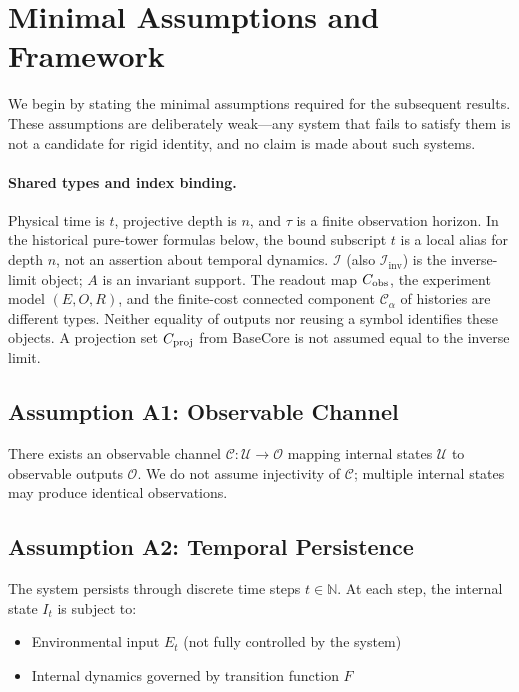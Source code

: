 \documentclass[11pt,a4paper]{article}
\theoremstyle{plain}
\theoremstyle{definition}
\theoremstyle{remark}
\begin{document}
\section{Minimal Assumptions and Framework}

We begin by stating the minimal assumptions required for the subsequent results. These assumptions are deliberately weak---any system that fails to satisfy them is not a candidate for rigid identity, and no claim is made about such systems.

\paragraph{Shared types and index binding.}
Physical time is $t$, projective depth is $n$, and $\tau$ is a finite observation horizon. In the historical pure-tower formulas below, the bound subscript $t$ is a local alias for depth $n$, not an assertion about temporal dynamics. $\mathcal I$ (also $\mathcal I_{\mathrm{inv}}$) is the inverse-limit object; $A$ is an invariant support. The readout map $C_{\rm obs}$, the experiment model $(E,O,R)$, and the finite-cost connected component $\mathcal C_\alpha$ of histories are different types. Neither equality of outputs nor reusing a symbol identifies these objects. A projection set $C_{\rm proj}$ from BaseCore is not assumed equal to the inverse limit.

\subsection{Assumption A1: Observable Channel}

There exists an observable channel $\mathcal{C}: \mathcal{U} \to \mathcal{O}$ mapping internal states $\mathcal{U}$ to observable outputs $\mathcal{O}$. We do not assume injectivity of $\mathcal{C}$; multiple internal states may produce identical observations.

\subsection{Assumption A2: Temporal Persistence}

The system persists through discrete time steps $t \in \mathbb{N}$. At each step, the internal state $I_t$ is subject to:
\begin{itemize}[leftmargin=*]
    \item Environmental input $E_t$ (not fully controlled by the system)
    \item Internal dynamics governed by transition function $F$
\end{itemize}
\end{document}
